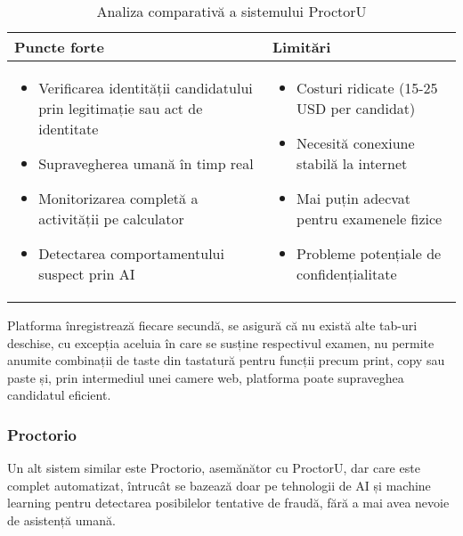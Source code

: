 \documentclass[12pt,a4paper]{article}
\begin{document}
\begin{table}[h]
\centering
\begin{tabular}{|p{7.5cm}|p{7.5cm}|}
\hline
\textbf{Puncte forte} & \textbf{Limitări} \\
\hline
\begin{itemize}
    \item Verificarea identității candidatului prin legitimație sau act de identitate
    \item Supravegherea umană în timp real
    \item Monitorizarea completă a activității pe calculator
    \item Detectarea comportamentului suspect prin AI
\end{itemize} & 
\begin{itemize}
    \item Costuri ridicate (15-25 USD per candidat)
    \item Necesită conexiune stabilă la internet
    \item Mai puțin adecvat pentru examenele fizice
    \item Probleme potențiale de confidențialitate
\end{itemize} \\
\hline
\end{tabular}
\caption{Analiza comparativă a sistemului ProctorU}
\end{table}

Platforma înregistrează fiecare secundă, se asigură că nu există alte tab-uri
deschise, cu excepția aceluia în care se susține respectivul examen,
nu permite anumite combinații de taste din tastatură pentru funcții precum 
print, copy sau paste și, prin intermediul unei camere web, platforma poate 
supraveghea candidatul eficient.

\subsubsection{Proctorio}
Un alt sistem similar este Proctorio, asemănător cu
ProctorU, dar care este complet automatizat, întrucât se bazează doar
pe tehnologii de AI și machine learning pentru detectarea posibilelor
tentative de fraudă, fără a mai avea nevoie de asistență umană.
\end{document}
